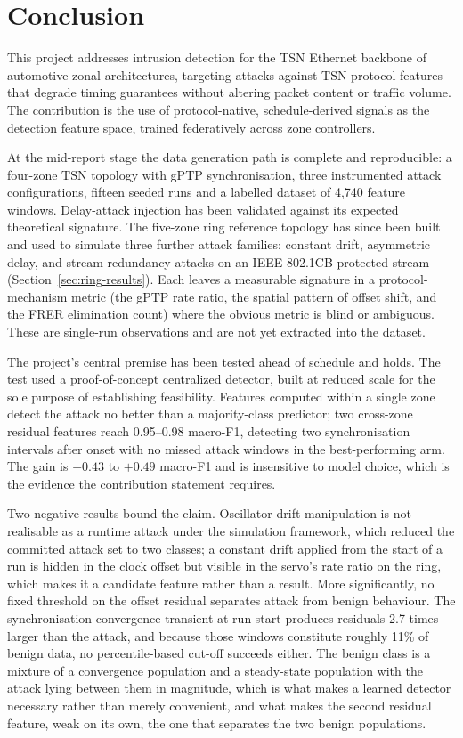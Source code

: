 \chapter{Conclusion}

This project addresses intrusion detection for the TSN Ethernet backbone of
automotive zonal architectures, targeting attacks against TSN protocol features that
degrade timing guarantees without altering packet content or traffic volume. The
contribution is the use of protocol-native, schedule-derived signals as the detection
feature space, trained federatively across zone controllers.

At the mid-report stage the data generation path is complete and reproducible: a
four-zone TSN topology with gPTP synchronisation, three instrumented attack
configurations, fifteen seeded runs and a labelled dataset of 4{,}740 feature windows.
Delay-attack injection has been validated against its expected theoretical signature.
The five-zone ring reference topology has since been built and used to simulate three
further attack families: constant drift, asymmetric delay, and stream-redundancy attacks
on an IEEE 802.1CB protected stream (Section~\ref{sec:ring-results}). Each leaves a
measurable signature in a protocol-mechanism metric (the gPTP rate ratio, the spatial
pattern of offset shift, and the FRER elimination count) where the obvious metric is
blind or ambiguous. These are single-run observations and are not yet extracted into
the dataset.

The project's central premise has been tested ahead of schedule and holds. The test used
a proof-of-concept centralized detector, built at reduced scale for the sole purpose of
establishing feasibility. Features computed within a single zone detect the attack no
better than a majority-class predictor; two cross-zone residual features reach
0.95--0.98 macro-F1, detecting two synchronisation intervals after onset with no missed
attack windows in the best-performing arm. The gain is $+0.43$ to $+0.49$ macro-F1 and
is insensitive to model choice, which is the evidence the contribution statement
requires.

Two negative results bound the claim. Oscillator drift manipulation is not realisable as
a runtime attack under the simulation framework, which reduced the committed attack set
to two classes; a constant drift applied from the start of a run is hidden in the clock
offset but visible in the servo's rate ratio on the ring, which makes it a candidate
feature rather than a result. More significantly, no fixed threshold on the offset
residual separates attack from benign behaviour. The synchronisation convergence
transient at run start produces residuals 2.7 times larger than the attack, and because
those windows constitute roughly 11\% of benign data, no percentile-based cut-off
succeeds either. The benign class is a mixture of a convergence population and a
steady-state population with the attack lying between them in magnitude, which is what
makes a learned detector necessary rather than merely convenient, and what makes the
second residual feature, weak on its own, the one that separates the two benign
populations.

